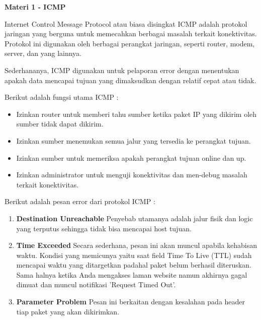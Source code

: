 \documentclass{article}
\begin{document}
    \begin{flushleft}
        \textbf{Materi 1 - ICMP}
        \newline

        Internet Control Message Protocol atau biasa disingkat ICMP adalah protokol jaringan yang berguna untuk memecahkan berbagai masalah terkait konektivitas. Protokol ini digunakan oleh berbagai perangkat jaringan, seperti router, modem, server, dan yang lainnya.
        \newline

        Sederhananya, ICMP digunakan untuk pelaporan error dengan menentukan apakah data mencapai tujuan yang dimaksudkan dengan relatif cepat atau tidak.

        Berikut adalah fungsi utama ICMP : 

        \begin{itemize}
            \item Izinkan router untuk memberi tahu sumber ketika paket IP yang dikirim oleh sumber tidak dapat dikirim.
            \item Izinkan sumber menemukan semua jalur yang tersedia ke perangkat tujuan.
            \item Izinkan sumber untuk memeriksa apakah perangkat tujuan online dan up.
            \item Izinkan administrator untuk menguji konektivitas dan men-debug masalah terkait konektivitas.
        \end{itemize}

        Berikut adalah pesan error dari protokol ICMP : 

        \begin{enumerate}
            \item \textbf{Destination Unreachable}
            \newline
            Penyebab utamanya adalah jalur fisik dan logic yang terputus sehingga tidak bisa mencapai host tujuan.

            \item \textbf{Time Exceeded}
            \newline
            Secara sederhana, pesan ini akan muncul apabila kehabisan waktu. Kondisi yang memicunya yaitu saat field Time To Live (TTL) sudah mencapai waktu yang ditargetkan padahal paket belum berhasil diteruskan. 
            Sama halnya ketika Anda mengakses laman website namun akhirnya gagal dimuat dan muncul notifikasi 'Request Timed Out'.

            \item \textbf{Parameter Problem}
            \newline
            Pesan ini berkaitan dengan kesalahan pada header tiap paket yang akan dikirimkan.


\end{enumerate}
\end{flushleft}
\end{document}
